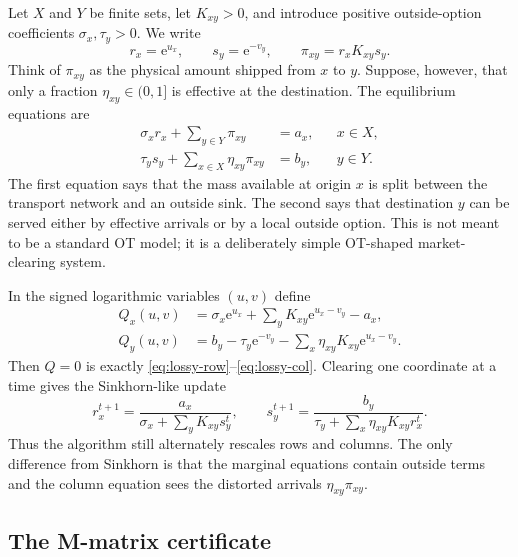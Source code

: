 \documentclass[11pt]{article}
\newcommand{\e}{\mathrm{e}}
\theoremstyle{definition}
\theoremstyle{plain}
\begin{document}
Let $X$ and $Y$ be finite sets, let $K_{xy}>0$, and introduce positive outside-option coefficients $\sigma_x,\tau_y>0$. We write
\[
        r_x=\e^{u_x},\qquad s_y=\e^{-v_y},\qquad
        \pi_{xy}=r_xK_{xy}s_y .
\]
Think of $\pi_{xy}$ as the physical amount shipped from $x$ to $y$. Suppose, however, that only a fraction $\eta_{xy}\in(0,1]$ is effective at the destination. The equilibrium equations are
\begin{align}
        \sigma_x r_x+\sum_{y\in Y}\pi_{xy}&=a_x,
        &&x\in X,\label{eq:lossy-row}\\
        \tau_y s_y+\sum_{x\in X}\eta_{xy}\pi_{xy}&=b_y,
        &&y\in Y.\label{eq:lossy-col}
\end{align}
The first equation says that the mass available at origin $x$ is split between the transport network and an outside sink. The second says that destination $y$ can be served either by effective arrivals or by a local outside option. This is not meant to be a standard OT model; it is a deliberately simple OT-shaped market-clearing system.

In the signed logarithmic variables $(u,v)$ define
\begin{align*}
        Q_x(u,v)
        &=\sigma_x\e^{u_x}+\sum_y K_{xy}\e^{u_x-v_y}-a_x,\\
        Q_y(u,v)
        &=b_y-\tau_y\e^{-v_y}-\sum_x\eta_{xy}K_{xy}\e^{u_x-v_y}.
\end{align*}
Then $Q=0$ is exactly \eqref{eq:lossy-row}--\eqref{eq:lossy-col}. Clearing one coordinate at a time gives the Sinkhorn-like update
\begin{equation}\label{eq:lossy-update}
        r_x^{t+1}
        =\frac{a_x}{\sigma_x+\sum_yK_{xy}s_y^t},
        \qquad
        s_y^{t+1}
        =\frac{b_y}{\tau_y+\sum_x\eta_{xy}K_{xy}r_x^t}.
\end{equation}
Thus the algorithm still alternately rescales rows and columns. The only difference from Sinkhorn is that the marginal equations contain outside terms and the column equation sees the distorted arrivals $\eta_{xy}\pi_{xy}$.

\subsection*{The M-matrix certificate}
\end{document}
